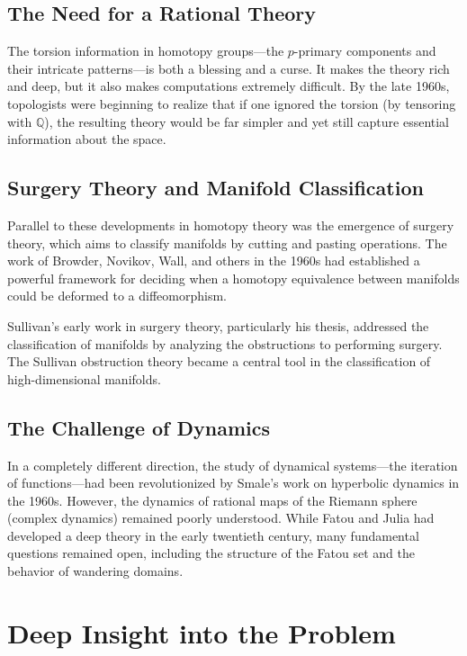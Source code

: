 \subsection{The Need for a Rational Theory}

The torsion information in homotopy groups---the $p$-primary components and their intricate patterns---is both a blessing and a curse. It makes the theory rich and deep, but it also makes computations extremely difficult. By the late 1960s, topologists were beginning to realize that if one ignored the torsion (by tensoring with $\mathbb{Q}$), the resulting theory would be far simpler and yet still capture essential information about the space.

\subsection{Surgery Theory and Manifold Classification}

Parallel to these developments in homotopy theory was the emergence of surgery theory, which aims to classify manifolds by cutting and pasting operations. The work of Browder, Novikov, Wall, and others in the 1960s had established a powerful framework for deciding when a homotopy equivalence between manifolds could be deformed to a diffeomorphism.

Sullivan's early work in surgery theory, particularly his thesis, addressed the classification of manifolds by analyzing the obstructions to performing surgery. The Sullivan obstruction theory became a central tool in the classification of high-dimensional manifolds.

\subsection{The Challenge of Dynamics}

In a completely different direction, the study of dynamical systems---the iteration of functions---had been revolutionized by Smale's work on hyperbolic dynamics in the 1960s. However, the dynamics of rational maps of the Riemann sphere (complex dynamics) remained poorly understood. While Fatou and Julia had developed a deep theory in the early twentieth century, many fundamental questions remained open, including the structure of the Fatou set and the behavior of wandering domains.

\section{Deep Insight into the Problem}

